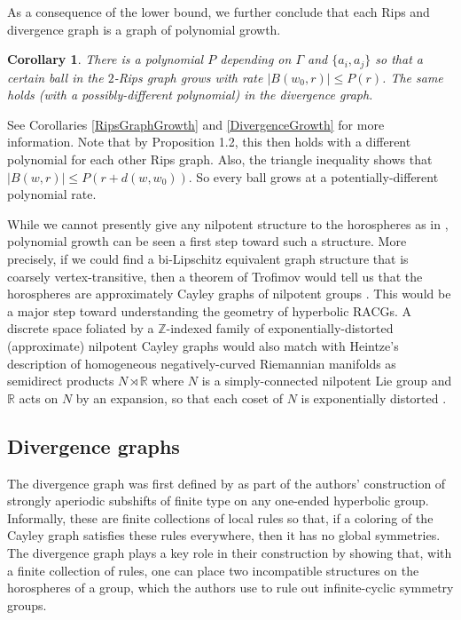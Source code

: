 \documentclass{amsart}
\newcommand{\R}{\mathbb{R}}
\newcommand{\Z}{\mathbb{Z}}
\newtheorem{corollary}[theorem]{Corollary}
\theoremstyle{definition}
\theoremstyle{remark}
\begin{document}
	As a consequence of the lower bound, we further conclude that each Rips and divergence graph is a graph of polynomial growth.
	
	\begin{corollary}
		
		There is a polynomial $P$ depending on $\Gamma$ and $\{a_i, a_j\}$ so that a certain ball in the $2$-Rips graph grows with rate $|B(w_0, r)|\le P(r)$. The same holds (with a possibly-different polynomial) in the divergence graph.
		
	\end{corollary}
	
	See Corollaries \ref{RipsGraphGrowth} and \ref{DivergenceGrowth} for more information. Note that by Proposition 1.2, this then holds with a different polynomial for each other Rips graph. Also, the triangle inequality shows that $|B(w, r)|\le P(r+d(w,w_0))$. So every ball grows at a potentially-different polynomial rate.
	
	While we cannot presently give any nilpotent structure to the horospheres as in \cite{PengitoreMcReynolds}, polynomial growth can be seen a first step toward such a structure. More precisely, if we could find a bi-Lipschitz equivalent graph structure that is coarsely vertex-transitive, then a theorem of Trofimov would tell us that the horospheres are approximately Cayley graphs of nilpotent groups \cite{Trofimov}. This would be a major step toward understanding the geometry of hyperbolic RACGs. A discrete space foliated by a $\Z$-indexed family of exponentially-distorted (approximate) nilpotent Cayley graphs would also match with Heintze's description of homogeneous negatively-curved Riemannian manifolds as semidirect products $N\rtimes \R$ where $N$ is a simply-connected nilpotent Lie group and $\R$ acts on $N$ by an expansion, so that each coset of $N$ is exponentially distorted \cite{Heinze}.


    \subsection*{Divergence graphs}

    The divergence graph was first defined by \cite{CGSR} as part of the authors' construction of strongly aperiodic subshifts of finite type on any one-ended hyperbolic group. Informally, these are finite collections of local rules so that, if a coloring of the Cayley graph satisfies these rules everywhere, then it has no global symmetries. The divergence graph plays a key role in their construction by showing that, with a finite collection of rules, one can place two incompatible structures on the horospheres of a group, which the authors use to rule out infinite-cyclic symmetry groups.
\end{document}
